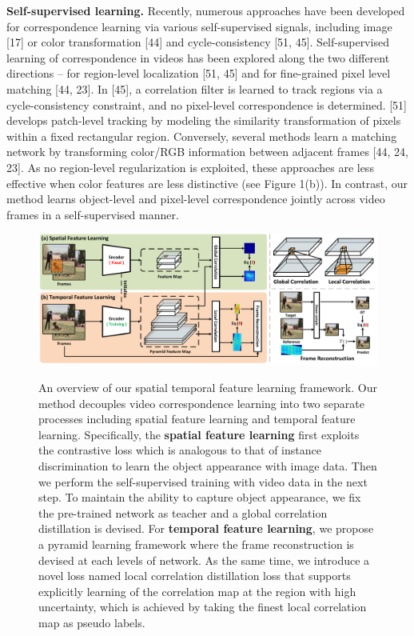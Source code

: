 \documentclass{article}
\begin{document}
\textbf{Self-supervised learning.} Recently, numerous approaches have been developed for correspondence learning via various self-supervised signals, including image [17] or color transformation [44] and cycle-consistency [51, 45]. Self-supervised learning of correspondence in videos has been explored along the two different directions – for region-level localization [51, 45] and for fine-grained pixel level matching [44, 23]. In [45], a correlation filter is learned to track regions via a cycle-consistency constraint, and no pixel-level correspondence is determined. [51] develops patch-level tracking by modeling the similarity transformation of pixels within a fixed rectangular region. Conversely, several methods learn a matching network by transforming color/RGB information between adjacent frames [44, 24, 23]. As no region-level regularization is exploited, these approaches are less effective when color features are less distinctive (see Figure 1(b)). In contrast, our method learns object-level and pixel-level correspondence jointly across video frames in a self-supervised manner.

\begin{figure}[!tb]
  \centering
  {\includegraphics[width=1.0\textwidth]{figure/framework/framework.pdf}}
  \caption{\small An overview of our spatial temporal feature learning framework. Our method  decouples video correspondence learning into two separate processes including spatial feature learning and temporal feature learning. Specifically, the \textbf{spatial feature learning} first exploits the contrastive loss which is analogous to that of instance discrimination to learn the object appearance with image data. Then we perform the self-supervised training with video data in the next step. To maintain the ability to capture object appearance, we fix the pre-trained network as teacher and a global correlation distillation is devised.  For \textbf{temporal feature learning}, we propose a pyramid learning framework where the frame reconstruction is devised at each levels of network. As the same time, we introduce a novel loss named local correlation distillation loss that supports explicitly learning of the correlation map at the region with high uncertainty, which is achieved by taking the finest local correlation map as pseudo labels.}
  \label{fig:framework}
  \vspace{-7mm}
\end{figure}
\end{document}
